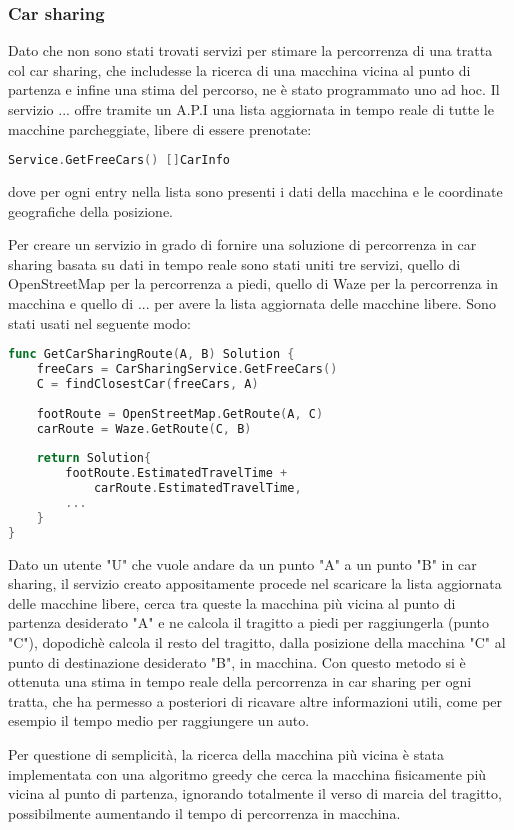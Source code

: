\subsubsection{Car sharing}

Dato che non sono stati trovati servizi per stimare la percorrenza di una tratta col car sharing, che includesse la ricerca di una macchina vicina al punto di partenza e infine una stima del percorso, ne è stato programmato uno ad hoc. Il servizio ... offre tramite un A.P.I una lista aggiornata in tempo reale di tutte le macchine parcheggiate, libere di essere prenotate:
\begin{lstlisting}[language=Go]
Service.GetFreeCars() []CarInfo
\end{lstlisting}
dove per ogni entry nella lista sono presenti i dati della macchina e le coordinate geografiche della posizione.

Per creare un servizio in grado di fornire una soluzione di percorrenza in car sharing basata su dati in tempo reale sono stati uniti tre servizi, quello di OpenStreetMap per la percorrenza a piedi, quello di Waze per la percorrenza in macchina e quello di ... per avere la lista aggiornata delle macchine libere. Sono stati usati nel seguente modo:
\begin{lstlisting}[language=Go]
func GetCarSharingRoute(A, B) Solution {
	freeCars = CarSharingService.GetFreeCars()
	C = findClosestCar(freeCars, A)
	
	footRoute = OpenStreetMap.GetRoute(A, C)
	carRoute = Waze.GetRoute(C, B)
	
	return Solution{
		footRoute.EstimatedTravelTime +
			carRoute.EstimatedTravelTime,
		...
	}
}
\end{lstlisting}
Dato un utente "U" che vuole andare da un punto "A" a un punto "B" in car sharing, il servizio creato appositamente procede nel scaricare la lista aggiornata delle macchine libere, cerca tra queste la macchina più vicina al punto di partenza desiderato "A" e ne calcola il tragitto a piedi per raggiungerla (punto "C"), dopodichè calcola il resto del tragitto, dalla posizione della macchina "C" al punto di destinazione desiderato "B", in macchina. Con questo metodo si è ottenuta una stima in tempo reale della percorrenza in car sharing per ogni tratta, che ha permesso a posteriori di ricavare altre informazioni utili, come per esempio il tempo medio per raggiungere un auto.

Per questione di semplicità, la ricerca della macchina più vicina è stata implementata con una algoritmo greedy che cerca la macchina fisicamente più vicina al punto di partenza, ignorando totalmente il verso di marcia del tragitto, possibilmente aumentando il tempo di percorrenza in macchina.

